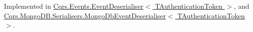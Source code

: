 Implemented in \hyperlink{classCqrs_1_1Events_1_1EventDeserialiser_a193feac1d58446f0a7447d8ba04179fc}{Cqrs.\+Events.\+Event\+Deserialiser$<$ T\+Authentication\+Token $>$}, and \hyperlink{classCqrs_1_1MongoDB_1_1Serialisers_1_1MongoDbEventDeserialiser_a2ea63367d97bf66e3dffcabb8c53005e}{Cqrs.\+Mongo\+D\+B.\+Serialisers.\+Mongo\+Db\+Event\+Deserialiser$<$ T\+Authentication\+Token $>$}.

